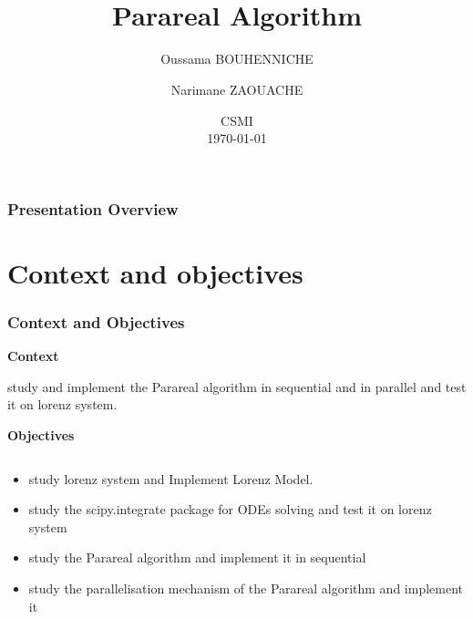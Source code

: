 \documentclass[
	11pt,
]{beamer}
\title[Parareal Algorithm]{\\ \textbf{Parareal Algorithm}}
\author[O. BOUHENNICHE \and N. ZAOUACHE]{Oussama BOUHENNICHE \and Narimane ZAOUACHE}
\institute[]{University of Strasbourg}
\date[\today]{ CSMI \\ \today}
\newcommand\myheading[1]{%
  \par\bigskip
  {\Large\bfseries#1}\par\smallskip}
\begin{document}

\begin{frame}
	\titlepage
\end{frame}


\begin{frame}
	\frametitle{Presentation Overview}

	\tableofcontents
\end{frame}
\section{Context and objectives}

\begin{frame}
	\frametitle{Context and Objectives}
	\myheading{Context}
          study and implement the Parareal algorithm in sequential and in parallel and test it on lorenz system.

	\myheading{Objectives}

	\begin{columns}[c]
		\begin{column}{\textwidth}
			\begin{itemize}
                   \item study lorenz system and Implement Lorenz Model.
                   \item study the scipy.integrate package for ODEs solving and test it on lorenz system
                   \item study the Parareal algorithm and implement it in sequential
                   \item  study the parallelisation mechanism of the Parareal algorithm and implement it
               \end{itemize}
		\end{column}

	\end{columns}

\end{frame}
\end{document}
